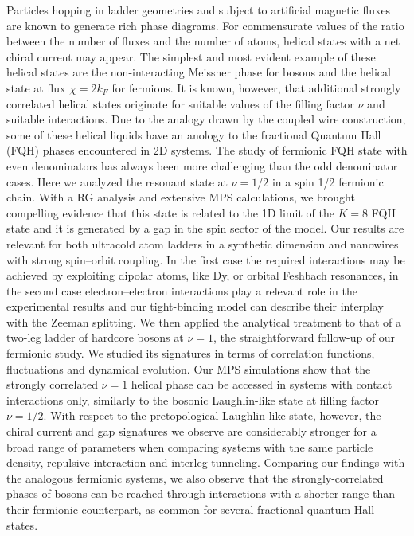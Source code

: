 Particles hopping in ladder geometries and subject to artificial magnetic fluxes are known to generate rich phase diagrams.
For commensurate values of the ratio between the number of fluxes and the number of atoms, helical states with a net chiral current may appear.
The simplest and most evident example of these helical states are the non-interacting Meissner phase for bosons and the helical state at flux $\chi = 2k_F$ for fermions.
It is known, however, that additional strongly correlated helical states originate for suitable values of the filling factor $\nu$ and suitable interactions.
Due to the analogy drawn by the coupled wire construction, some of these helical liquids have an anology to the fractional Quantum Hall (FQH) phases encountered in 2D systems.
The study of fermionic FQH state with even denominators has always been more challenging than the odd denominator cases.
Here we analyzed the resonant state at $\nu=1/2$ in a spin 1/2 fermionic chain.
With a RG analysis and extensive MPS calculations, we brought compelling evidence that this state is related to the 1D limit of the $K=8$ FQH state and it is generated by a gap in the spin sector of the model.
Our results are relevant for both ultracold atom ladders in a synthetic dimension and nanowires with strong spin–orbit coupling.
In the first case the required interactions may be achieved by exploiting dipolar atoms, like Dy, or orbital Feshbach resonances, in the second case electron–electron interactions play a relevant role in the experimental results and our tight-binding model can describe their interplay with the Zeeman splitting.
We then applied the analytical treatment to that of a two-leg ladder of hardcore bosons at $\nu=1$, the straightforward follow-up of our fermionic study.
We studied its signatures in terms of correlation functions, fluctuations and dynamical evolution.
Our MPS simulations show that the strongly correlated $\nu=1$ helical phase can be accessed in systems with contact interactions only, similarly to the bosonic Laughlin-like state at filling factor $\nu = 1/2$.
With respect to the pretopological Laughlin-like state, however, the chiral current and gap signatures we observe are considerably stronger for a broad range of parameters when comparing systems with the same particle density, repulsive interaction and interleg tunneling.
Comparing our findings with the analogous fermionic systems, we also observe that the strongly-correlated phases of bosons can be reached through interactions with a shorter range than their fermionic counterpart, as common for several fractional quantum Hall states.
